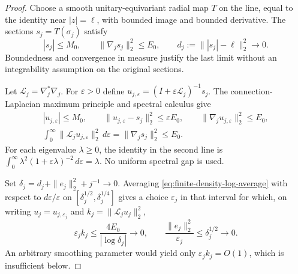 \begin{proof}
Choose a smooth unitary-equivariant radial map $T$ on the line,
equal to the identity near $|z|=\ell$, with bounded image and bounded
derivative.  The sections $s_j=T(\sigma_j)$ satisfy
\[
 |s_j|\le M_0,\qquad \|\nabla_js_j\|_2^2\le E_0,
 \qquad d_j:=\||s_j|-\ell\|_2^2\longrightarrow0.
\]
Boundedness and convergence in measure justify the last limit without
an integrability assumption on the original sections.

Let $\mathcal L_j=\nabla_j^*\nabla_j$.  For $\varepsilon>0$ define
$u_{j,\varepsilon}=(I+\varepsilon\mathcal L_j)^{-1}s_j$.
The connection-Laplacian maximum principle and spectral calculus give
\begin{gather}
 |u_{j,\varepsilon}|\le M_0,\qquad
 \|u_{j,\varepsilon}-s_j\|_2^2\le\varepsilon E_0,
 \qquad\|\nabla_ju_{j,\varepsilon}\|_2^2\le E_0,
 \label{eq:finite-density-line-resolvent}\\
 \int_0^\infty\|\mathcal L_ju_{j,\varepsilon}\|_2^2\,d\varepsilon
       =\|\nabla_js_j\|_2^2\le E_0.
 \label{eq:finite-density-log-average}
\end{gather}
For each eigenvalue $\lambda\ge0$, the identity in the second line is
$\int_0^\infty\lambda^2(1+\varepsilon\lambda)^{-2}
\,d\varepsilon=\lambda$.  No uniform spectral gap is used.

Set $\delta_j=d_j+\|e_j\|_2^2+j^{-1}\to0$.  Averaging
\eqref{eq:finite-density-log-average} with respect to
$d\varepsilon/\varepsilon$ on
$[\delta_j^{1/2},\delta_j^{1/4}]$ gives a choice
$\varepsilon_j$ in that interval for which, on writing
$u_j=u_{j,\varepsilon_j}$ and
$k_j=\|\mathcal L_ju_j\|_2^2$,
\begin{equation}
 \varepsilon_jk_j\le\frac{4E_0}{|\log\delta_j|}\longrightarrow0,
 \qquad
 \frac{\|e_j\|_2^2}{\varepsilon_j}\le\delta_j^{1/2}
       \longrightarrow0.
 \label{eq:finite-density-log-selection}
\end{equation}
An arbitrary smoothing parameter would yield only
$\varepsilon_jk_j=O(1)$, which is insufficient below.


\end{proof}
